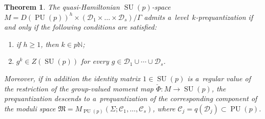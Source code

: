 \documentclass[pdftex]{sigma}
\numberwithin{equation}{section}
\newtheorem{Theorem}{Theorem}[section]
\DeclareMathOperator{\SU}{SU}
\DeclareMathOperator{\PU}{PU}
\begin{document}
\begin{Theorem}
\label{thm:obs}
The quasi-Hamiltonian $\SU(p)$-space $M=D(\PU(p))^h \times (\mathcal{D}_1 \times \dots \times
\mathcal{D}_s)/{\Gamma} $ admits a~level~$k$-prequantization if and only if the following conditions are
satisfied:
\begin{enumerate}\itemsep=0pt
\item[$i)$]
\label{thm:obs-double}
if $h\geq 1$, then $k \in p{\mathbb{N}}$;
\item[$ii)$]
\label{thm:obs-conj}
$g^k \in Z(\SU(p))$ for every $\displaystyle g \in \mathcal{D}_1 \cup \cdots \cup \mathcal{D}_s$.
\end{enumerate}
Moreover, if in addition the identity matrix $1 \in \SU(p)$ is a~regular value of the restriction of the group-valued
moment map $\check{\Phi}:M\to \SU(p)$, the prequantization descends to a~prequantization of the corresponding component
of the moduli space $\mathfrak{M}=M_{\PU(p)}(\Sigma; \mathcal{C}_1, \ldots, \mathcal{C}_s)$, where
$\mathcal{C}_j=q(\mathcal{D}_j) \subset \PU(p)$.
\end{Theorem}
\end{document}
